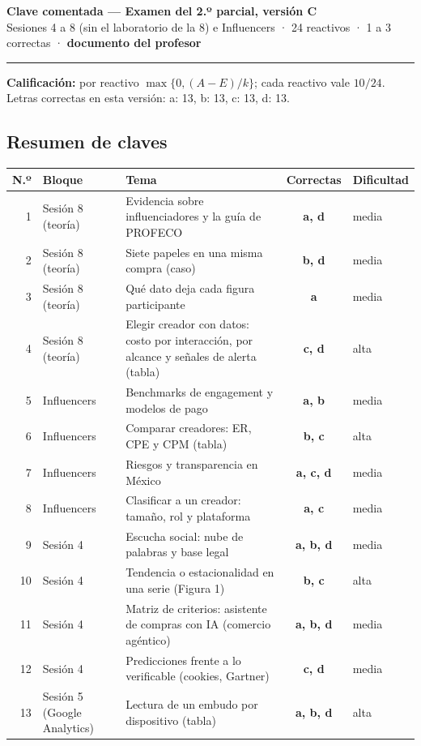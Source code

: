 \documentclass[10pt,letterpaper]{article}
\begin{document}
{\color{guinda}\large\textbf{Clave comentada — Examen del 2.º parcial, versión C}}\\
{\small Sesiones 4 a 8 (sin el laboratorio de la 8) e Influencers · 24 reactivos · 1 a 3 correctas · \textbf{documento del profesor}}
\vspace{4pt}\hrule\vspace{4pt}
\textbf{Calificación:} por reactivo $\max\{0,(A-E)/k\}$; cada reactivo vale $10/24$. Letras correctas en esta versión: a: 13, b: 13, c: 13, d: 13.
\subsection*{Resumen de claves}\begin{center}\footnotesize\begin{tabular}{@{}rllcl@{}}\toprule N.º & Bloque & Tema & Correctas & Dificultad\\\midrule
1 & Sesión 8 (teoría) & Evidencia sobre influenciadores y la guía de PROFECO & \textbf{a, d} & media\\
2 & Sesión 8 (teoría) & Siete papeles en una misma compra (caso) & \textbf{b, d} & media\\
3 & Sesión 8 (teoría) & Qué dato deja cada figura participante & \textbf{a} & media\\
4 & Sesión 8 (teoría) & Elegir creador con datos: costo por interacción, por alcance y señales de alerta (tabla) & \textbf{c, d} & alta\\
5 & Influencers & Benchmarks de engagement y modelos de pago & \textbf{a, b} & media\\
6 & Influencers & Comparar creadores: ER, CPE y CPM (tabla) & \textbf{b, c} & alta\\
7 & Influencers & Riesgos y transparencia en México & \textbf{a, c, d} & media\\
8 & Influencers & Clasificar a un creador: tamaño, rol y plataforma & \textbf{a, c} & media\\
9 & Sesión 4 & Escucha social: nube de palabras y base legal & \textbf{a, b, d} & media\\
10 & Sesión 4 & Tendencia o estacionalidad en una serie (Figura 1) & \textbf{b, c} & alta\\
11 & Sesión 4 & Matriz de criterios: asistente de compras con IA (comercio agéntico) & \textbf{a, b, d} & media\\
12 & Sesión 4 & Predicciones frente a lo verificable (cookies, Gartner) & \textbf{c, d} & media\\
13 & Sesión 5 (Google Analytics) & Lectura de un embudo por dispositivo (tabla) & \textbf{a, b, d} & alta\\

\end{tabular}
\end{center}
\end{document}
